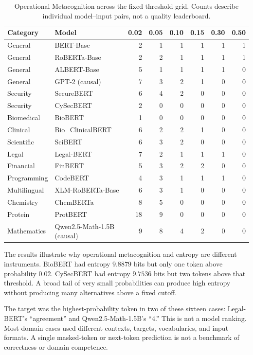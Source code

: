 \documentclass[11pt,a4paper]{article}
\begin{document}
\begin{table}[h]
\centering
\caption{Operational Metacognition across the fixed threshold grid. Counts describe individual model--input pairs, not a quality leaderboard.}
\label{tab:model-comparison}
{\scriptsize
\setlength{\tabcolsep}{4pt}
\begin{tabular}{llrrrrrr}
\toprule
Category & Model & 0.02 & 0.05 & 0.10 & 0.15 & 0.30 & 0.50 \\
\midrule
General & BERT-Base & 2 & 1 & 1 & 1 & 1 & 1 \\
General & RoBERTa-Base & 2 & 2 & 1 & 1 & 1 & 1 \\
General & ALBERT-Base & 5 & 1 & 1 & 1 & 1 & 0 \\
General & GPT-2 (causal) & 7 & 3 & 2 & 1 & 0 & 0 \\
Security & SecureBERT & 6 & 4 & 2 & 0 & 0 & 0 \\
Security & CySecBERT & 2 & 0 & 0 & 0 & 0 & 0 \\
Biomedical & BioBERT & 1 & 0 & 0 & 0 & 0 & 0 \\
Clinical & Bio\_ClinicalBERT & 6 & 2 & 2 & 1 & 0 & 0 \\
Scientific & SciBERT & 6 & 3 & 2 & 0 & 0 & 0 \\
Legal & Legal-BERT & 7 & 2 & 1 & 1 & 1 & 0 \\
Financial & FinBERT & 5 & 3 & 2 & 2 & 0 & 0 \\
Programming & CodeBERT & 4 & 3 & 1 & 1 & 1 & 0 \\
Multilingual & XLM-RoBERTa-Base & 6 & 3 & 1 & 0 & 0 & 0 \\
Chemistry & ChemBERTa & 8 & 5 & 0 & 0 & 0 & 0 \\
Protein & ProtBERT & 18 & 9 & 0 & 0 & 0 & 0 \\
Mathematics & Qwen2.5-Math-1.5B (causal) & 9 & 8 & 4 & 2 & 0 & 0 \\
\bottomrule
\end{tabular}
}
\end{table}

The results illustrate why operational metacognition and entropy are different instruments. BioBERT had entropy $9.8879$ bits but only one token above probability 0.02. CySecBERT had entropy $9.7536$ bits but two tokens above that threshold. A broad tail of very small probabilities can produce high entropy without producing many alternatives above a fixed cutoff.

The target was the highest-probability token in two of these sixteen cases: Legal-BERT's ``agreement'' and Qwen2.5-Math-1.5B's ``4.'' This is not a model ranking. Most domain cases used different contexts, targets, vocabularies, and input formats. A single masked-token or next-token prediction is not a benchmark of correctness or domain competence.
\end{document}
